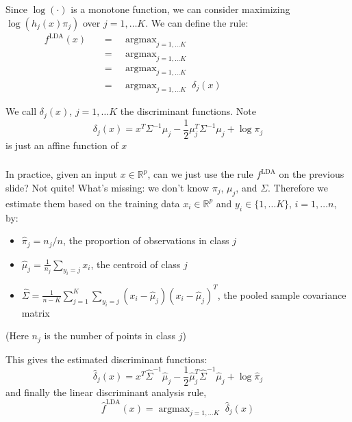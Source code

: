 \documentclass[mathserif]{beamer}
\newcommand{\argmax}{\mathop{\mathrm{argmax}}}
\def\R{\mathds{R}}
\def\red{\color[rgb]{0.8,0,0}}
\begin{document}
\begin{frame}
\frametitle{}
\smallskip
Since $\log(\cdot)$ is a monotone function, we can consider maximizing
$\log(h_j(x) \pi_j)$ over $j=1,\ldots K$. We can define the rule:
\begin{align*}
f^\mathrm{LDA}(x) \;\;\;&=\;\;\;
\argmax_{j=1,\ldots K} \; \hspace{150pt} \\
\;\;\;&=\;\;\; 
\argmax_{j=1,\ldots K} \; \hspace{150pt} \\
\;\;\;&=\;\;\; 
\argmax_{j=1,\ldots K} \; \hspace{150pt} \\
\;\;\;&=\;\;\; 
\argmax_{j=1,\ldots K} \; \delta_j(x) 
\end{align*} 

\bigskip
We call $\delta_j(x)$, $j=1,\ldots K$ the {\red discriminant functions}. Note
$$\delta_j(x) = x^T \Sigma^{-1} \mu_j - \frac{1}{2}\mu_j^T \Sigma^{-1} 
\mu_j + \log\pi_j $$
is just an affine function of $x$
\end{frame}

\begin{frame}
\frametitle{}
\bigskip
In practice, given an input $x\in\R^p$, can we just use the rule 
$f^\mathrm{LDA}$ on the previous slide?
Not quite! What's missing: we don't know $\pi_j$, $\mu_j$, and $\Sigma$. Therefore 
we {\red estimate them} based on the training data $x_i \in \R^p$ and 
$y_i \in \{1,\ldots K\}$, $i=1,\ldots n$, by:
\smallskip
\begin{itemize}
\item $\hat{\pi}_j = n_j/n$, the proportion of observations in class $j$
\item $\hat{\mu}_j = \frac{1}{n_j} \sum_{y_i=j} x_i$, the centroid of class $j$
\item $\hat{\Sigma} = \frac{1}{n-K} \sum_{j=1}^K \sum_{y_i=j} 
(x_i - \hat{\mu}_j)(x_i - \hat{\mu}_j)^T$, the pooled sample covariance matrix
\end{itemize}
(Here $n_j$ is the number of points in class $j$)

\bigskip
This gives the estimated discriminant functions:
$$\hat{\delta}_j(x) = x^T \hat{\Sigma}^{-1} \hat{\mu}_j - 
\frac{1}{2}\hat{\mu}_j^T \hat{\Sigma}^{-1}\hat{\mu}_j + \log\hat{\pi}_j$$
and finally the linear discriminant analysis rule,
$$\hat{f}^\mathrm{LDA}(x) = \argmax_{j=1,\ldots K} \; \hat{\delta}_j(x)$$
\end{frame}
\end{document}
